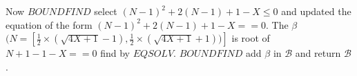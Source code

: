 \documentclass[12pt]{extarticle}
\theoremstyle{definition}
\begin{document}

Now $BOUNDFIND$ select $(N-1)^2+2(N-1)+1-X\leq 0$ and updated the equation of the form  $(N-1)^2+2(N-1)+1-X==0$. The $\beta$ $(N=[\frac{1}{2}\times(\sqrt{4X+1}-1),\frac{1}{2}\times(\sqrt{4X+1}+1))]$ is root of $N + 1-1-X==0$ find by $EQSOLV$. $BOUNDFIND$ add 
$\beta$ in $\mathcal{B}$ and return  $\mathcal{B}$.


%

\end{document}
